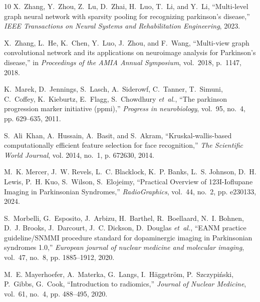 \documentclass{article}
\begin{document}
\begin{thebibliography}{10}
X.~Zhang, Y.~Zhou, Z.~Lu, D.~Zhai, H.~Luo, T.~Li, and Y.~Li, ``Multi-level
  graph neural network with sparsity pooling for recognizing parkinson’s
  disease,'' \emph{IEEE Transactions on Neural Systems and Rehabilitation
  Engineering}, 2023.

X.~Zhang, L.~He, K.~Chen, Y.~Luo, J.~Zhou, and F.~Wang,
``Multi-view graph convolutional network and its applications on neuroimage analysis for Parkinson’s disease,''
in \emph{Proceedings of the AMIA Annual Symposium}, vol.~2018, p.~1147, 2018.

K.~Marek, D.~Jennings, S.~Lasch, A.~Siderowf, C.~Tanner, T.~Simuni, C.~Coffey,
  K.~Kieburtz, E.~Flagg, S.~Chowdhury \emph{et~al.}, ``The parkinson
  progression marker initiative (ppmi),'' \emph{Progress in neurobiology},
  vol.~95, no.~4, pp. 629--635, 2011.

S.~Ali~Khan, A.~Hussain, A.~Basit, and S.~Akram, ``Kruskal-wallis-based
  computationally efficient feature selection for face recognition,'' \emph{The
  Scientific World Journal}, vol. 2014, no.~1, p. 672630, 2014.

M.~K. Mercer, J.~W. Revels, L.~C. Blacklock, K.~P. Banks, L.~S. Johnson, D.~H. Lewis, P.~H. Kuo, S.~Wilson, S.~Elojeimy, ``Practical Overview of 123I-Ioflupane Imaging in Parkinsonian Syndromes,'' \emph{RadioGraphics}, vol.~44, no.~2, pp. e230133, 2024.

S.~Morbelli, G.~Esposito, J.~Arbizu, H.~Barthel, R.~Boellaard, N.~I. Bohnen, D.~J. Brooks, J.~Darcourt, J.~C. Dickson, D.~Douglas \emph{et~al.}, ``EANM practice guideline/SNMMI procedure standard for dopaminergic imaging in Parkinsonian syndromes 1.0,'' \emph{European journal of nuclear medicine and molecular imaging}, vol.~47, no.~8, pp. 1885--1912, 2020.

M.~E. Mayerhoefer, A.~Materka, G.~Langs, I.~H{\"a}ggstr{\"o}m, P.~Szczypi{\'n}ski, P.~Gibbs, G.~Cook, ``Introduction to radiomics,'' \emph{Journal of Nuclear Medicine}, vol.~61, no.~4, pp. 488--495, 2020.

\end{thebibliography}
\end{document}

